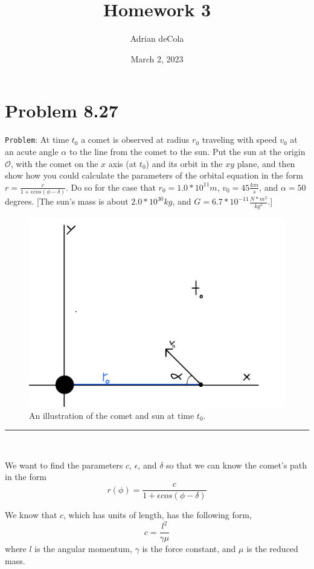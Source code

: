 \documentclass{article}
\title{Homework 3}
\author{Adrian deCola}
\date{March 2, 2023}
\begin{document}
\maketitle


\section*{Problem 8.27}
\verb+Problem+: At time $t_0$ a comet is observed at radius $r_0$ traveling with speed $v_0$ at an acute angle $\alpha$ to the line from the comet to the sun. Put the sun at the origin $\mathcal{O}$, with the comet on the $x$ axis (at $t_0$) and its orbit in the $xy$ plane, and then show how you could calculate the parameters of the orbital equation in the form $r = \frac{c}{1 + \epsilon cos(\phi - \delta )}$. Do so for the case that $r_0= 1.0 * 10^{11}m$, $v_0= 45 \frac{km}{s}$, and $\alpha = 50$ degrees. [The sun's mass is about $2.0 * 10^{30}kg$, and $G = 6.7 * 10^{-11} \frac{N*m^2}{kg^2}$.]


\begin{figure}[!h]
    \centering
    \includegraphics[width=.6\textwidth]{Drawing.png}
    \caption{An illustration of the comet and sun at time $t_0$.}
\end{figure}

\hrule
         \ \ \ 

We want to find the parameters $c$, $\epsilon$, and $\delta$ so that we can know the comet's path in the form 
$$r(\phi) = \frac{c}{1 + \epsilon  cos(\phi - \delta )}$$

We know that $c$, which has units of length, has the following form, $$c = \frac{l^2}{\gamma \mu}$$
where $l$ is the angular momentum, $\gamma$ is the force constant, and $\mu$ is the reduced mass.
\end{document}
